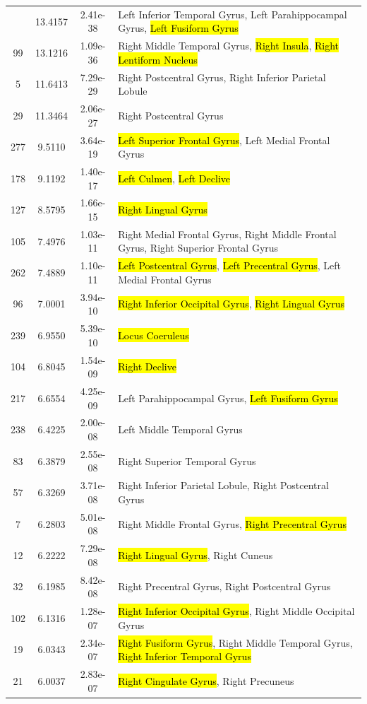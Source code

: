 \documentclass[10pt,letterpaper]{article}\usepackage[]{graphicx}\usepackage[]{color}
\begin{document}
\begin{longtable}[c]{cccp{3.2in}}
	\bottomrule
	\endlastfoot
	243 & 13.4157 & 2.41e-38 & Left Inferior Temporal Gyrus, Left Parahippocampal Gyrus, \hl{Left Fusiform Gyrus} \\
	99 & 13.1216 & 1.09e-36 & Right Middle Temporal Gyrus, \hl{Right Insula}, \hl{Right Lentiform Nucleus} \\
	5 & 11.6413 & 7.29e-29 & Right Postcentral Gyrus, Right Inferior Parietal Lobule \\
	29 & 11.3464 & 2.06e-27 & Right Postcentral Gyrus \\
	277 & 9.5110 & 3.64e-19 & \hl{Left Superior Frontal Gyrus}, Left Medial Frontal Gyrus \\
	178 & 9.1192 & 1.40e-17 & \hl{Left Culmen}, \hl{Left Declive} \\
	127 & 8.5795 & 1.66e-15 & \hl{Right Lingual Gyrus} \\
	105 & 7.4976 & 1.03e-11 & Right Medial Frontal Gyrus, Right Middle Frontal Gyrus, Right Superior Frontal Gyrus\\
	262 & 7.4889 & 1.10e-11 & \hl{Left Postcentral Gyrus}, \hl{Left Precentral Gyrus}, Left Medial Frontal Gyrus \\
	96 & 7.0001 & 3.94e-10 & \hl{Right Inferior Occipital Gyrus}, \hl{Right Lingual Gyrus} \\
	239 & 6.9550 & 5.39e-10 & \hl{Locus Coeruleus} \\
	104 & 6.8045 & 1.54e-09 & \hl{Right Declive} \\
	217 & 6.6554 & 4.25e-09 & Left Parahippocampal Gyrus, \hl{Left Fusiform Gyrus} \\
	238 & 6.4225 & 2.00e-08 & Left Middle Temporal Gyrus \\
	83 & 6.3879 & 2.55e-08 & Right Superior Temporal Gyrus \\
	57 & 6.3269 & 3.71e-08 & Right Inferior Parietal Lobule, Right Postcentral Gyrus \\
	7 & 6.2803 & 5.01e-08 & Right Middle Frontal Gyrus, \hl{Right Precentral Gyrus} \\
	12 & 6.2222 & 7.29e-08 & \hl{Right Lingual Gyrus}, Right Cuneus \\
	32 & 6.1985 & 8.42e-08 & Right Precentral Gyrus, Right Postcentral Gyrus \\
	102 & 6.1316 & 1.28e-07 & \hl{Right Inferior Occipital Gyrus}, Right Middle Occipital Gyrus \\
	19 & 6.0343 & 2.34e-07 & \hl{Right Fusiform Gyrus}, Right Middle Temporal Gyrus, \hl{Right Inferior Temporal Gyrus} \\
	21 & 6.0037 & 2.83e-07 & \hl{Right Cingulate Gyrus}, Right Precuneus \\

\end{longtable}
\end{document}
